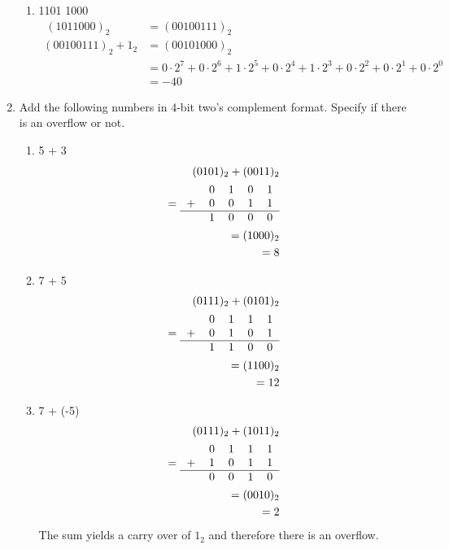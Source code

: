 \documentclass[12pt]{article}
\begin{document}
\begin{enumerate}
\begin{enumerate}
      \item 1101 1000
      \begin{align*}
        ~(101 1000)_2 &= (0010 0111)_2 \\
        (0010 0111)_2 + 1_2 &= (0010 1000)_2 \\
        &= 0 \cdot 2^7 + 0 \cdot 2^6 + 1 \cdot 2^5 + 0 \cdot 2^4 + 1 \cdot 2^3 + 0 \cdot 2^2 + 0 \cdot 2^1 + 0 \cdot 2^0 \\
        &= -40
      \end{align*}

    \end{enumerate}

    \item Add the following numbers in 4-bit two’s complement format. Specify if there is an overflow or not.
    \begin{enumerate}
      \item 5 + 3
      \begin{align*}
        (0101)_2 + (0011)_2 \\
        = \begin{tabular}{ccccc}
          & 0 & 1 & 0 & 1 \\
        + & 0 & 0 & 1 & 1 \\
        \hline
          & 1 & 0 & 0 & 0 \\
        \end{tabular} \\
        = (1000)_2 \\
        = 8
      \end{align*}

      \item 7 + 5
      \begin{align*}
        (0111)_2 + (0101)_2 \\
        = \begin{tabular}{ccccc}
          & 0 & 1 & 1 & 1 \\
        + & 0 & 1 & 0 & 1 \\
        \hline
          & 1 & 1 & 0 & 0 \\
        \end{tabular} \\
        = (1100)_2 \\
        = 12
      \end{align*}

      \item 7 + (-5)
      \begin{align*}
        (0111)_2 + (1011)_2 \\
        = \begin{tabular}{ccccc}
          & 0 & 1 & 1 & 1 \\
        + & 1 & 0 & 1 & 1 \\
        \hline
          & 0 & 0 & 1 & 0 \\
        \end{tabular} \\
        = (0010)_2 \\
        = 2
      \end{align*}
      The sum yields a carry over of $1_2$ and therefore there is an overflow.


\end{enumerate}
\end{enumerate}
\end{document}
